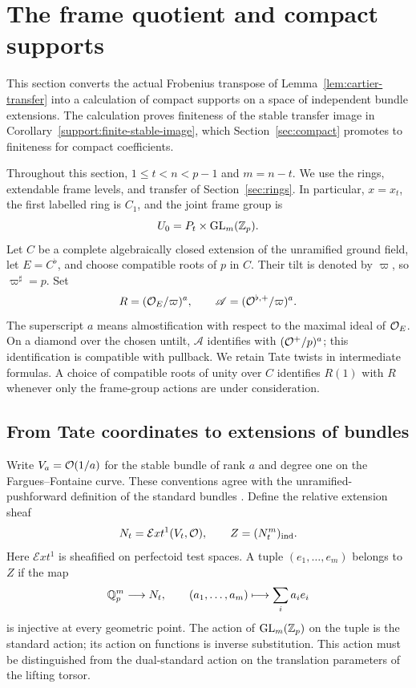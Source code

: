 \section{The frame quotient and compact supports}
\label{sec:support}

This section converts the actual Frobenius transpose of
Lemma~\ref{lem:cartier-transfer} into a calculation of compact supports on a
space of independent bundle extensions. The calculation proves finiteness
of the stable transfer image in Corollary~\ref{support:finite-stable-image},
which Section~\ref{sec:compact} promotes to finiteness for compact coefficients.

Throughout this section, $1\leq t<n<p-1$ and $m=n-t$.
We use the rings, extendable frame levels, and transfer of
Section~\ref{sec:rings}.  In particular, $x=x_t$, the first labelled
ring is $C_1$, and the joint frame group is
\[
 U_0=P_t\times\operatorname{GL}_m(\mathbb Z_p).
\]
Let $C$ be a complete algebraically closed extension of the unramified
ground field, let $E=C^\flat$, and choose compatible roots of $p$ in $C$.
Their tilt is denoted by $\varpi$, so $\varpi^\sharp=p$.  Set
\[
 R=(\mathcal O_E/\varpi)^a,
 \qquad
 \mathscr A=(\mathcal O^{\flat,+}/\varpi)^a.
\]
The superscript $a$ means almostification with respect to the maximal
ideal of $\mathcal O_E$.  On a diamond over the chosen untilt, $\mathscr A$
identifies with $(\mathcal O^+/p)^a$; this identification is compatible with
pullback.  We retain Tate twists in intermediate formulas.  A choice of
compatible roots of unity over $C$ identifies $R(1)$ with $R$ whenever
only the frame-group actions are under consideration.

\subsection{From Tate coordinates to extensions of bundles}

Write $V_a=\mathcal O(1/a)$ for the stable bundle of rank $a$ and degree one
on the Fargues--Fontaine curve.  These conventions agree with the
unramified-pushforward definition of the standard bundles
\cite[Definition~8.2.2 and Theorem~8.2.10]{FarguesFontaine}.
Define the relative extension sheaf
\[
 N_t=\mathcal{E}xt^1(V_t,\mathcal O),
 \qquad Z=(N_t^m)_{\mathrm{ind}}.
\]
Here $\mathcal{E}xt^1$ is sheafified on perfectoid test spaces.  A tuple
$(e_1,\ldots,e_m)$ belongs to $Z$ if the map
\[
 \mathbb Q_p^m\longrightarrow N_t,\qquad
 (a_1,\ldots,a_m)\longmapsto\sum_i a_i e_i
\]
is injective at every geometric point.  The action of $\operatorname{GL}_m(\mathbb Z_p)$ on
the tuple is the standard action; its action on functions is inverse
substitution.  This action must be distinguished from the dual-standard
action on the translation parameters of the lifting torsor.


